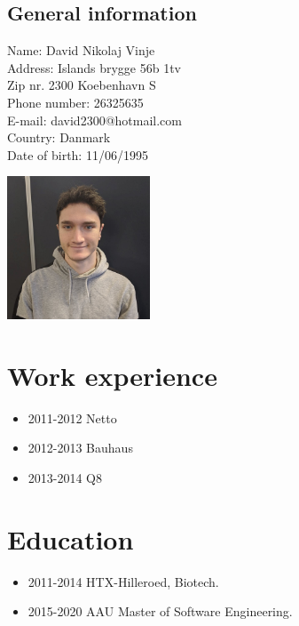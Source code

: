 \begin{center}
 \begin{minipage}[b]{0.45\textwidth} 
\subsection*{General information}
Name: David Nikolaj Vinje \\
Address: Islands brygge 56b 1tv \\
Zip nr. 2300 Koebenhavn S \\
Phone number: 26325635 \\
E-mail: david2300@hotmail.com \\
Country: Danmark \\
Date of birth: 11/06/1995
\newline
 \end{minipage}
 \hfill
\begin{minipage}[b]{4.5cm}
 \includegraphics[height=4.25cm]{figures/Billede_af_David}
 \end{minipage}
 \end{center}

\section*{Work experience}
\begin{itemize}
\item 2011-2012 Netto
\item 2012-2013 Bauhaus
\item 2013-2014 Q8
\end{itemize}
\section*{Education}
\begin{itemize}
\item 2011-2014 HTX-Hilleroed, Biotech.
\item 2015-2020 AAU Master of Software Engineering.
\end{itemize}


